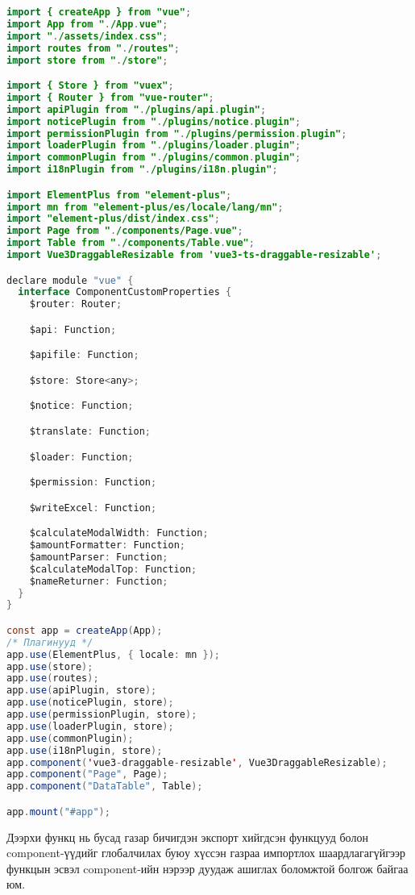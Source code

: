 \begin{lstlisting}[language=java, caption=Vue application эхлүүлэх үндсэн функц, frame=single]
import { createApp } from "vue";
import App from "./App.vue";
import "./assets/index.css";
import routes from "./routes";
import store from "./store";

import { Store } from "vuex";
import { Router } from "vue-router";
import apiPlugin from "./plugins/api.plugin";
import noticePlugin from "./plugins/notice.plugin";
import permissionPlugin from "./plugins/permission.plugin";
import loaderPlugin from "./plugins/loader.plugin";
import commonPlugin from "./plugins/common.plugin";
import i18nPlugin from "./plugins/i18n.plugin";

import ElementPlus from "element-plus";
import mn from "element-plus/es/locale/lang/mn";
import "element-plus/dist/index.css";
import Page from "./components/Page.vue";
import Table from "./components/Table.vue";
import Vue3DraggableResizable from 'vue3-ts-draggable-resizable';

declare module "vue" {
  interface ComponentCustomProperties {
    $router: Router;

    $api: Function;

    $apifile: Function;

    $store: Store<any>;

    $notice: Function;

    $translate: Function;

    $loader: Function;

    $permission: Function;

    $writeExcel: Function;

    $calculateModalWidth: Function;
    $amountFormatter: Function;
    $amountParser: Function;
    $calculateModalTop: Function;
    $nameReturner: Function;
  }
}

const app = createApp(App);
/* Плагинууд */
app.use(ElementPlus, { locale: mn });
app.use(store);
app.use(routes);
app.use(apiPlugin, store);
app.use(noticePlugin, store);
app.use(permissionPlugin, store);
app.use(loaderPlugin, store);
app.use(commonPlugin);
app.use(i18nPlugin, store);
app.component('vue3-draggable-resizable', Vue3DraggableResizable);
app.component("Page", Page);
app.component("DataTable", Table);

app.mount("#app");

\end{lstlisting}
Дээрхи функц нь бусад газар бичигдэн экспорт хийгдсэн функцууд болон component-үүдийг глобалчилах буюу хүссэн газраа импортлох шаардлагагүйгээр функцын эсвэл component-ийн нэрээр дуудаж ашиглах боломжтой болгож байгаа юм.

